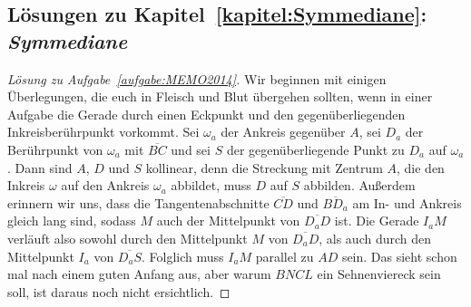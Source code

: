 \subsection*{Lösungen zu Kapitel~\ref{kapitel:Symmediane}: \emph{Symmediane}}

\begin{proof}[Lösung zu Aufgabe~\ref{aufgabe:MEMO2014}]
	Wir beginnen mit einigen Überlegungen, die euch in Fleisch und Blut übergehen sollten, wenn in einer Aufgabe die Gerade durch einen Eckpunkt und den gegenüberliegenden Inkreisberührpunkt vorkommt. Sei $\omega_a$ der Ankreis gegenüber $A$, sei $D_a$ der Berührpunkt von $\omega_a$ mit $\overline{BC}$ und sei $S$ der gegenüberliegende Punkt zu $D_a$ auf $\omega_a$. Dann sind $A$, $D$ und $S$ kollinear, denn die Streckung mit Zentrum $A$, die den Inkreis $\omega$ auf den Ankreis $\omega_a$ abbildet, muss $D$ auf $S$ abbilden. Außerdem erinnern wir uns, dass die Tangentenabschnitte $\overline{CD}$ und $\overline{BD_a}$ am In- und Ankreis gleich lang sind, sodass $M$ auch der Mittelpunkt von $\overline{D_aD}$ ist. Die Gerade $I_aM$ verläuft also sowohl durch den Mittelpunkt $M$ von $\overline{D_aD}$, als auch durch den Mittelpunkt $I_a$ von $\overline{D_aS}$. Folglich muss $I_aM$ parallel zu $AD$ sein. Das sieht schon mal nach einem guten Anfang aus, aber warum $BNCL$ ein Sehnenviereck sein soll, ist daraus noch nicht ersichtlich.
	

\end{proof}
